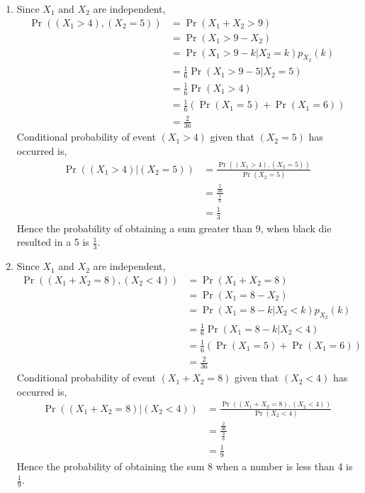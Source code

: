 \documentclass[10pt,twocolumn]{article}
\providecommand{\pr}[1]{\ensuremath{\Pr\left(#1\right)}}
\providecommand{\brak}[1]{\ensuremath{\left(#1\right)}}
\begin{document}
\begin{enumerate}
\item Since $X_1$ and $X_2$ are independent,
\begin{align}
\Pr{\brak{\brak{X_1 > 4},\brak{X_2=5}}}
&= \pr{X_1 + X_2 > 9} \\
&= \pr{X_1  > 9 -X_2} \\
&= \pr{X_1  > 9 -k | X_2 = k}p_{X_2}(k) \\
&= \frac{1}{6} \pr{X_1  > 9 -5 | X_2 = 5} \\
&= \frac{1}{6} \pr{X_1 > 4} \\
&= \frac{1}{6} (\pr{X_1 = 5} + \pr{X_1 = 6}) \\
&= \frac{2}{36}
\end{align}
Conditional probability of event $(X_1 > 4)$ given that $(X_2 = 5)$ has occurred is, 
\begin{align}
\Pr{\brak{\brak{X_1 > 4}|\brak{X_2=5}}}
&=\frac{\Pr{((X_1 > 4),(X_2=5))}}{\Pr{\brak{X_2=5}}}\\
&=\frac{\frac{2}{36}}{\frac{1}{6}}\\
&=\frac{1}{3}
\end{align}  
Hence the probability of obtaining a sum greater than 9, when black die resulted in a 5 is $\frac{1}{3}$. 

\item Since $X_1$ and $X_2$ are independent,
\begin{align}
\Pr{\brak{\brak{X_1 + X_2 = 8},\brak{X_2<4}}} 
&= \pr{X_1 + X_2 = 8} \\
&= \pr{X_1  = 8 -X_2} \\
&= \pr{X_1  = 8 -k | X_2 < k}p_{X_2}(k) \\
&= \frac{1}{6} \pr{X_1  = 8 -k | X_2 < 4} \\
&= \frac{1}{6} (\pr{X_1 = 5} + \pr{X_1 = 6}) \\
&= \frac{2}{36}
\end{align}
Conditional probability of event $(X_1 + X_2 = 8)$ given that $(X_2 < 4)$ has occurred is, 
\begin{align}
\Pr{\brak{\brak{X_1 + X_2 = 8}|\brak{X_2<4}}} 
&= \frac{\Pr{((X_1 + X_2 = 8),(X_2 < 4))}}{\Pr{\brak{X_2 < 4}}} \\
&= \frac{\frac{2}{36}}{\frac{3}{6}}\\
&= \frac{1}{9}
\end{align} 
Hence the probability of obtaining the sum 8 when a number is less than 4 is $\frac{1}{9}$. 
\end{enumerate}
\end{document}
